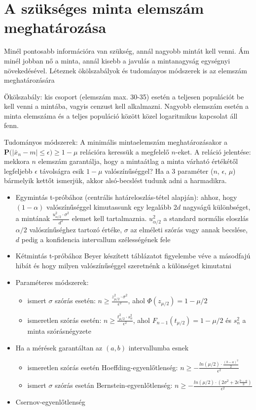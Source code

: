 \section{A szükséges minta elemszám meghatározása}

Minél pontosabb információra van szükség, annál nagyobb mintát kell venni. Ám minél jobban nő a minta, annál kisebb a javulás a mintanagyság egységnyi növekedésével. Léteznek ökölszabályok és tudományos módszerek is az elemszám meghatározására

Ökölszabály: kis csoport (elemszám max. 30-35) esetén a teljesen populációt be kell venni a mintába, vagyis cenzust kell alkalmazni. Nagyobb elemszám esetén a minta elemszáma és a teljes populáció között közel logaritmikus kapcsolat áll fenn.

Tudományos módszerek: A minimális mintaelemszám meghatározásakor a $\mathbf{P}\big( | \bar{x}_n - m | \leq \epsilon \big)\geq 1-\mu$ relációra keressük a megfelelő $n$-eket. A reláció jelentése: mekkora $n$ elemszám garantálja, hogy a mintaátlag a minta várható értékétől legfeljebb $\epsilon$ távolságra esik $1-\mu$ valószínűséggel? Ha a 3 paraméter ($n$, $\epsilon$, $\mu$) bármelyik kettőt ismerjük, akkor alsó-becslést tudunk adni a harmadikra.
\begin{itemize}
\item Egymintás t-próbához (centrális határeloszlás-tétel alapján): ahhoz, hogy $(1-\alpha)$ valószínűséggel kimutassunk egy legalább $2d$ nagyságű különbséget, a mintának $\frac{u_{\alpha/2}^2 \cdot \sigma^2}{d^2}$ elemet kell tartalmaznia. $u_{\alpha/2}^2$ a standard normális eloszlás $\alpha/2$ valószínűséghez tartozó értéke, $\sigma$ az elméleti szórás vagy annak becslése, $d$ pedig a konfidencia intervallum szélességének fele
\item Kétmintás t-próbához Beyer készített táblázatot figyelembe véve a másodfajú hibát és hogy milyen valószínűséggel szeretnénk a különséget kimutatni
\item Paraméteres módszerek:
	\begin{itemize}
	\item ismert $\sigma$ szórás esetén: $n \geq \frac{z_{\mu/2}^2 \cdot \sigma^2}{\epsilon^2}$, ahol $\Phi(z_{\mu/2}) = 1- \mu/2$
	\item ismeretlen szórás esetén:  $n \geq \frac{t_{\mu/2}^2 \cdot s_n^2}{\epsilon^2}$, ahol $F_{n-1}(t_{\mu/2}) = 1- \mu/2$ és $s_n^2$ a minta szórásnégyzete
	\end{itemize}
\item Ha a mérések garantáltan az $(a,b)$ intervallumba esnek
	\begin{itemize}
	\item ismeretlen szórás esetén Hoeffding-egyenlőtlenség: $n \geq -\frac{ln(\mu/2) \cdot \frac{(b-a)^2}{2}}{\epsilon^2}$
	\item ismert $\sigma$ szórás esetán Bernstein-egyenlőtlenség: $n \geq -\frac{ln(\mu/2) \cdot (2 \sigma^2 + 2\epsilon \frac{b-a}{3})}{\epsilon^2}$
	\end{itemize}
\item Csernov-egyenlőtlenség
\end{itemize}
